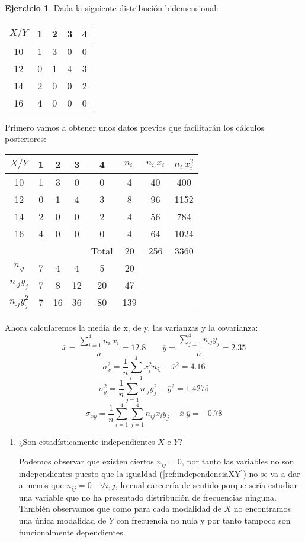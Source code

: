 \documentclass[a4paper, 12pt]{article}
\theoremstyle{definition}
\newtheorem{ej}{Ejercicio}
\begin{document}
\begin{ej}
Dada la siguiente distribución bidemensional:

\begin{center}
\begin{tabular}{c | c c c c}
	\(X/Y\) & 1 & 2 & 3 & 4 \\
	\hline
	10 & 1 & 3 & 0 & 0 \\
	12 & 0 & 1 & 4 & 3 \\
	14 & 2 & 0 & 0 & 2 \\
	16 & 4 & 0 & 0 & 0
\end{tabular}
\end{center}

Primero vamos a obtener unos datos previos que facilitarán los cálculos posteriores:

\begin{center}
	\begin{tabular}{c | c c c c | c c c}
	\(X/Y\) & 1 & 2 & 3 & 4 & \(n_{i.}\) & \(n_{i.} x_i\) & \(n_{i.} x_i^2\)\\
	\hline
	10 & 1 & 3 & 0 & 0 & 4 & 40 & 400 \\
	12 & 0 & 1 & 4 & 3 & 8 & 96 & 1152 \\
	14 & 2 & 0 & 0 & 2 & 4 & 56 & 784 \\
	16 & 4 & 0 & 0 & 0 & 4 & 64 & 1024 \\
	\hline
	& & & & Total & 20 & 256 & 3360 \\
	\hline
	\(n_{.j}\) & 7 & 4 & 4 & 5 & 20 & & \\
	\(n_{.j} y_j\) & 7 & 8 & 12 & 20 & 47 \\
	\(n_{.j} y_j^2\) & 7 & 16 & 36 & 80 & 139
	\end{tabular}
	\end{center}
	
Ahora calcularemos la media de x, de y, las varianzas y la covarianza:
\[
	\overline{x} = \frac{\sum_{i=1}^{4} n_{i.} x_i}{n} = 12.8 \qquad \overline{y} = \frac{\sum_{j=1}^{4} n_{.j} y_j}{n} = 2.35
\]
\[
	\sigma_x^2 = \frac{1}{n} \sum_{i=1}^{4} x_i^2 n_{i.} - \overline{x}^2 = 4.16
\]
\[
	\sigma_y^2 = \frac{1}{n} \sum_{j=1} n_{.j} y_j^2 - \overline{y}^2 = 1.4275
\]
\[
	\sigma_{xy} = \frac{1}{n} \sum_{i=1}^{4} \sum_{j=1}^{4} n_{ij} x_i y_j - \overline{x}\ \overline{y} = -0.78
\]

\begin{enumerate}[label=\alph*)]
	\item ¿Son estadísticamente independientes \(X\) e \(Y\)?
	
	Podemos observar que existen ciertos \(n_{ij} = 0\), por tanto las variables no son independientes puesto que la igualdad (\ref{ref:independenciaXY}) no se va a dar a menos que \(n_{ij} = 0 \quad \forall i,j\), lo cual carecería de sentido porque sería estudiar una variable que no ha presentado distribución de frecuencias ninguna. También observamos que como para cada modalidad de \(X\) no encontramos una única modalidad de \(Y\) con frecuencia no nula y por tanto tampoco son funcionalmente dependientes.
	

\end{enumerate}
\end{ej}
\end{document}
